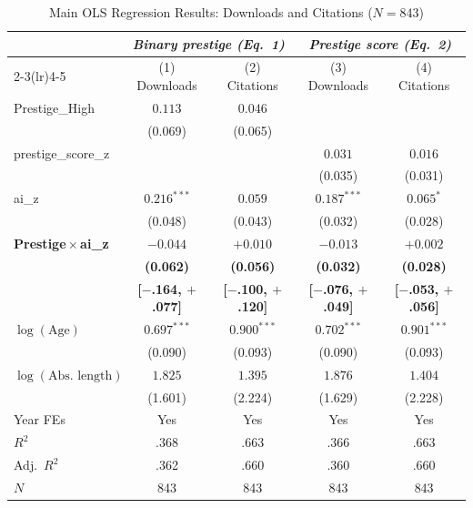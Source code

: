 \documentclass[12pt,a4paper]{article}
\begin{document}
\begin{table}[htbp]
\centering
\caption{Main OLS Regression Results: Downloads and Citations ($N = 843$)}
\label{tab:main}
\begin{threeparttable}
\small
\begin{tabular}{lcccc}
\toprule
 & \multicolumn{2}{c}{\textit{Binary prestige (Eq.~1)}}
 & \multicolumn{2}{c}{\textit{Prestige score (Eq.~2)}} \\
\cmidrule(lr){2-3}\cmidrule(lr){4-5}
 & (1) Downloads & (2) Citations & (3) Downloads & (4) Citations \\
\midrule
Prestige\_High
  & $0.113$       & $0.046$       &               &              \\
  & (0.069)       & (0.065)       &               &              \\[4pt]
prestige\_score\_z
  &               &               & $0.031$       & $0.016$      \\
  &               &               & (0.035)       & (0.031)      \\[4pt]
ai\_z
  & $0.216^{***}$ & $0.059$       & $0.187^{***}$ & $0.065^{*}$  \\
  & (0.048)       & (0.043)       & (0.032)       & (0.028)      \\[4pt]
\textbf{Prestige\,$\times$\,ai\_z}
  & $\mathbf{-0.044}$ & $\mathbf{+0.010}$ & $\mathbf{-0.013}$ & $\mathbf{+0.002}$ \\
  & \textbf{(0.062)}  & \textbf{(0.056)}  & \textbf{(0.032)}  & \textbf{(0.028)}  \\
  & \textbf{[$-$.164, $+$.077]} & \textbf{[$-$.100, $+$.120]}
  & \textbf{[$-$.076, $+$.049]} & \textbf{[$-$.053, $+$.056]} \\[4pt]
$\log(\text{Age})$
  & $0.697^{***}$ & $0.900^{***}$ & $0.702^{***}$ & $0.901^{***}$ \\
  & (0.090)       & (0.093)       & (0.090)       & (0.093)       \\[4pt]
$\log(\text{Abs.\ length})$
  & $1.825$       & $1.395$       & $1.876$       & $1.404$       \\
  & (1.601)       & (2.224)       & (1.629)       & (2.228)       \\[4pt]
\midrule
Year FEs           & Yes  & Yes  & Yes  & Yes  \\
$R^2$              & .368 & .663 & .366 & .663 \\
Adj.\ $R^2$        & .362 & .660 & .360 & .660 \\
$N$                & 843  & 843  & 843  & 843  \\

\end{tabular}
\end{threeparttable}
\end{table}
\end{document}
